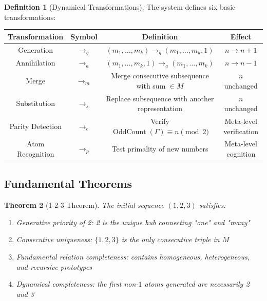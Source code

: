 \documentclass[12pt]{article}
\newtheorem{theorem}{Theorem}[section]
\theoremstyle{definition}
\newtheorem{definition}[theorem]{Definition}
\newcommand{\OddCount}{\operatorname{OddCount}}
\begin{document}
\begin{definition}[Dynamical Transformations]
The system defines six basic transformations:
\begin{center}
\begin{tabular}{|c|c|c|c|}
\hline
\textbf{Transformation} & \textbf{Symbol} & \textbf{Definition} & \textbf{Effect} \\
\hline
Generation & \(\rightarrow_g\) & \((m_1,\dots,m_k) \rightarrow_g (m_1,\dots,m_k,1)\) & \(n \rightarrow n+1\) \\
Annihilation & \(\rightarrow_a\) & \((m_1,\dots,m_k,1) \rightarrow_a (m_1,\dots,m_k)\) & \(n \rightarrow n-1\) \\
Merge & \(\rightarrow_m\) & Merge consecutive subsequence with sum \(\in M\) & \(n\) unchanged \\
Substitution & \(\rightarrow_s\) & Replace subsequence with another representation & \(n\) unchanged \\
Parity Detection & \(\rightarrow_e\) & Verify \(\OddCount(\Gamma) \equiv n \pmod{2}\) & Meta-level verification \\
Atom Recognition & \(\rightarrow_p\) & Test primality of new numbers & Meta-level cognition \\
\hline
\end{tabular}
\end{center}
\end{definition}

\subsection{Fundamental Theorems}

\begin{theorem}[1-2-3 Theorem]
The initial sequence \((1,2,3)\) satisfies:
\begin{enumerate}
    \item Generative priority of 2: 2 is the unique hub connecting "one" and "many"
    \item Consecutive uniqueness: \(\{1,2,3\}\) is the only consecutive triple in \(M\)
    \item Fundamental relation completeness: contains homogeneous, heterogeneous, and recursive prototypes
    \item Dynamical completeness: the first non-\(1\) atoms generated are necessarily 2 and 3
\end{enumerate}
\end{theorem}
\end{document}
